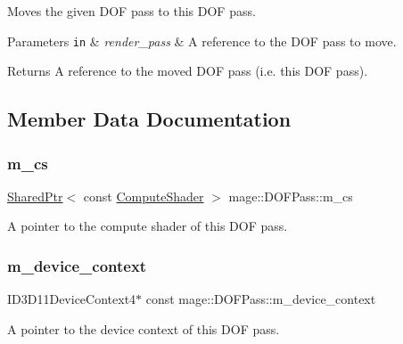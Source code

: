 Moves the given D\+OF pass to this D\+OF pass.


\begin{DoxyParams}[1]{Parameters}
\mbox{\tt in}  & {\em render\+\_\+pass} & A reference to the D\+OF pass to move. \\
\hline
\end{DoxyParams}
\begin{DoxyReturn}{Returns}
A reference to the moved D\+OF pass (i.\+e. this D\+OF pass). 
\end{DoxyReturn}


\subsection{Member Data Documentation}
\hypertarget{classmage_1_1_d_o_f_pass_a4fdc59697e57d5174a3a859f528c4d17}{}\label{classmage_1_1_d_o_f_pass_a4fdc59697e57d5174a3a859f528c4d17} 
\subsubsection{\texorpdfstring{m\+\_\+cs}{m\_cs}}
{\footnotesize\ttfamily \hyperlink{namespacemage_a1e01ae66713838a7a67d30e44c67703e}{Shared\+Ptr}$<$ const \hyperlink{namespacemage_ae040329401484b076f0cd1a7c43d19c9}{Compute\+Shader} $>$ mage\+::\+D\+O\+F\+Pass\+::m\+\_\+cs\hspace{0.3cm}{\ttfamily [private]}}

A pointer to the compute shader of this D\+OF pass. \hypertarget{classmage_1_1_d_o_f_pass_a4f0255efe5c79a597462c1535675290e}{}\label{classmage_1_1_d_o_f_pass_a4f0255efe5c79a597462c1535675290e} 
\subsubsection{\texorpdfstring{m\+\_\+device\+\_\+context}{m\_device\_context}}
{\footnotesize\ttfamily I\+D3\+D11\+Device\+Context4$\ast$ const mage\+::\+D\+O\+F\+Pass\+::m\+\_\+device\+\_\+context\hspace{0.3cm}{\ttfamily [private]}}

A pointer to the device context of this D\+OF pass. 